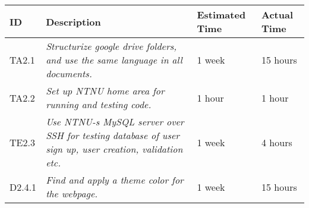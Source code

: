 \documentclass[11pt]{report}
\begin{document}
\begin{minipage}{\linewidth}
\setlength{\tabcolsep}{12pt}
\centering
{}
\begin{tabular}{|p{1cm}|p{4cm}|p{2cm}|p{2cm}|}
\hline
\cellcolor{gray!25} ID & \cellcolor{gray!25} Description & \cellcolor{gray!25} Estimated Time & \cellcolor{gray!25} Actual Time \\
\hline
TA2.1 & \it{Structurize google drive folders, and use the same language in all documents.} & 1 week & 15 hours \\
TA2.2 & \it{Set up NTNU home area for running and testing code.} & 1 hour & 1 hour \\
TE2.3 & \it{Use NTNU-s MySQL server over SSH for testing database of user sign up, user creation, validation etc. } & 1 week & 4 hours \\
D2.4.1 & \it{Find and apply a theme color for the webpage. } & 1 week & 15 hours \\
\hline
\end{tabular}
\end{minipage}
\end{document}
